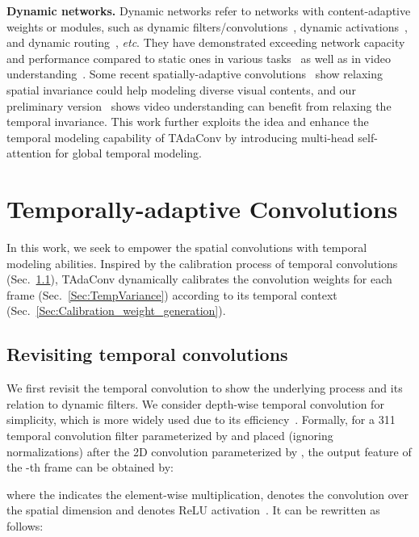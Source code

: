 \documentclass[10pt,journal,compsoc]{IEEEtran}
\def\x{}
\begin{document}
\textbf{Dynamic networks. }
Dynamic networks refer to networks with content-adaptive weights or modules, such as dynamic filters/convolutions~\cite{dynamicfilter,condconv,dcd,ddf},
dynamic activations~\cite{micronet,dynamicrelu}, and dynamic routing~\cite{skipnet,dynamicrouting}, \textit{etc}.
They have demonstrated exceeding network capacity and performance compared to static ones in various tasks~\cite{ye2022dck,jiang2020convbert,xu2020udvd,wu2019dynamicconv} as well as in video understanding~\cite{tam,adafuse,wu2019adaframe,meng2020arnet}.
Some recent spatially-adaptive convolutions~\cite{lrlc,drconv} show relaxing spatial invariance could help modeling diverse visual contents, and our preliminary version~\cite{huangtada} shows video understanding can benefit from relaxing the temporal invariance.
This work further exploits the idea and enhance the temporal modeling capability of TAdaConv by introducing multi-head self-attention for global temporal modeling.

\section{Temporally-adaptive Convolutions}

In this work, we seek to empower the spatial convolutions with temporal modeling abilities. 
Inspired by the calibration process of temporal convolutions (Sec.~\ref{Sec:TempConv}), TAdaConv dynamically calibrates the convolution weights for each frame (Sec.~\ref{Sec:TempVariance}) according to its temporal context (Sec.~\ref{Sec:Calibration_weight_generation}). 

\subsection{Revisiting temporal convolutions}
\label{Sec:TempConv}

We first revisit the temporal convolution to show the underlying process and its relation to dynamic filters. 
We consider depth-wise temporal convolution for simplicity, which is more widely used due to its efficiency~\cite{tam,stm}.
Formally, for a 3\x1\x1 temporal convolution filter parameterized by  and placed (ignoring normalizations) after the 2D convolution parameterized by , the output feature  of the -th frame can be obtained by:

\noindent where the  indicates the element-wise multiplication,  denotes the convolution over the spatial dimension and  denotes ReLU activation~\cite{relu}. It can be rewritten as follows:
\end{document}
